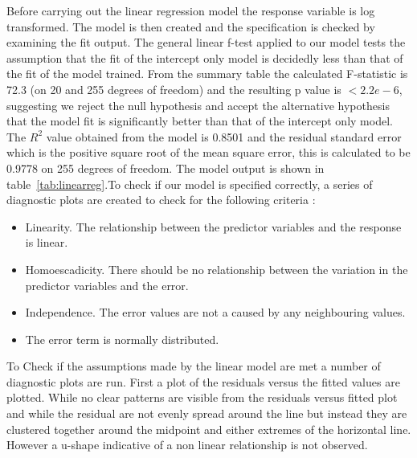 Before carrying out the linear regression model the response variable is log transformed. The model is then created and the specification is checked by examining the fit output. The general linear f-test applied to our model tests the assumption that the fit of the intercept only model is decidedly less than that of the fit of the model trained. From the summary table the calculated F-statistic is 72.3 (on 20 and 255 degrees of freedom) and the resulting p value is $< 2.2e-6$, suggesting we reject the null hypothesis and accept the alternative hypothesis that the model fit is significantly better than that of the intercept only model. The $R^2$ value obtained from the model is  0.8501 and the residual standard error which is the positive square root of the mean square error, this is calculated to be 0.9778 on 255 degrees of freedom. The model output is shown in table~\ref{tab:linearreg}.To check if our model is specified correctly, a series of diagnostic plots are created to check for the following criteria :
\begin{itemize}
\item Linearity. The relationship between the predictor variables and the response is linear.
\item Homoescadicity. There should be no relationship between the variation in the predictor variables and the error.
\item Independence. The error values are not a caused by any neighbouring values.
\item The error term is normally distributed.
\end{itemize}

To Check if the assumptions made by the linear model are met a number of diagnostic plots are run. First a plot of the residuals versus the fitted values are plotted. While no clear patterns are visible from the residuals versus fitted plot and while the residual are not evenly spread around the line but instead they are clustered together around the midpoint and either extremes of the horizontal line. However a u-shape indicative of a non linear relationship is not observed. 

